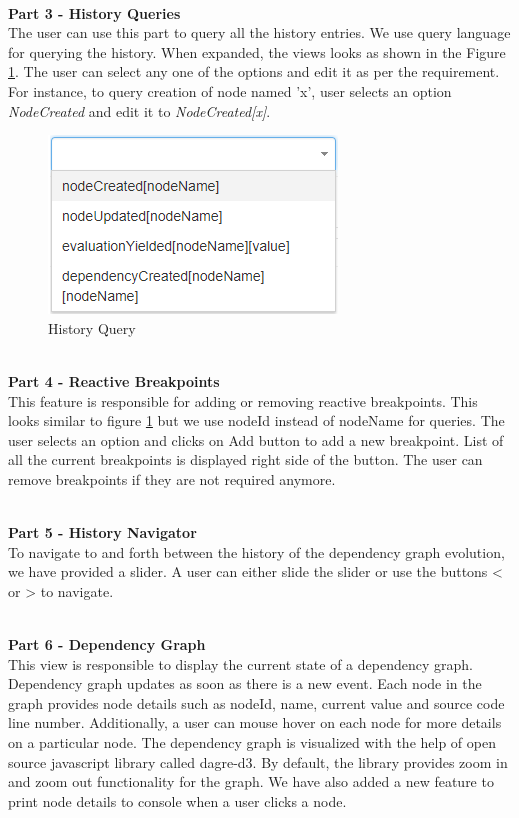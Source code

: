 \leavevmode
\\
\textbf{Part 3 - History Queries}
\\
The user can use this part to query all the history entries. We use query language for querying the history. When expanded, the views looks as shown in the Figure \ref{fig:language-query}. The user can select any one of the options and edit it as per the requirement. For instance, to query creation of node named 'x', user selects an option \textit{NodeCreated} and edit it to \textit{NodeCreated[x]}.
\begin{figure}[!h]
	\centering
	\includegraphics[scale=1,trim=0 0 0 0]{images/language-query.png}
	\caption{History Query}
	\label{fig:language-query}
\end{figure}

\leavevmode
\\
\textbf{Part 4 - Reactive Breakpoints}
\\
This feature is responsible for adding or removing reactive breakpoints. This looks similar to figure \ref{fig:language-query} but we use nodeId instead of nodeName for queries. The user selects an option and clicks on Add button to add a new breakpoint. List of all the current breakpoints is displayed right side of the button. The user can remove breakpoints if they are not required anymore.

\leavevmode
\\
\textbf{Part 5 - History Navigator}
\\
To navigate to and forth between the history of the dependency graph evolution, we have provided a slider. A user can either slide the slider or use the buttons < or > to navigate. 

\leavevmode
\\
\textbf{Part 6 - Dependency Graph}
\\
This view is responsible to display the current state of a dependency graph. Dependency graph updates as soon as there is a new event. Each node in the graph provides node details such as nodeId, name, current value and source code line number. Additionally, a user can mouse hover on each node for more details on a particular node. The dependency graph is visualized with the help of open source javascript library called dagre-d3\cite{dagred3}. By default, the library provides zoom in and zoom out functionality for the graph. We have also added a new feature to print node details to console when a user clicks a node. 